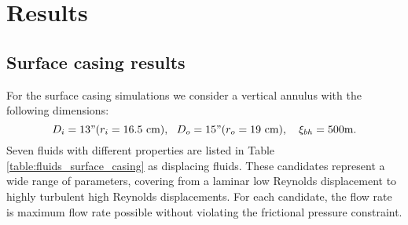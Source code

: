 \documentclass[review]{elsarticle}
\begin{document}
\section{Results}
\label{sec:results}

\subsection{Surface casing results}
\label{sec:surface}

For the surface casing simulations we consider a vertical annulus with the following dimensions:
\[
	  D_{i} = 13" ( r_i = 16.5 \text{ cm}), ~~ D_{o} = 15" ( r_o = 19 \text{ cm}),~~~  \xi_{bh} = 500\text{m}.
\]
Seven fluids with different properties are listed in Table \ref{table:fluids_surface_casing} as displacing fluids. These candidates represent a wide range of parameters, covering from a laminar low Reynolds displacement to highly turbulent high Reynolds displacements. For each candidate, the flow rate is maximum flow rate possible without violating the frictional pressure constraint.
\end{document}
